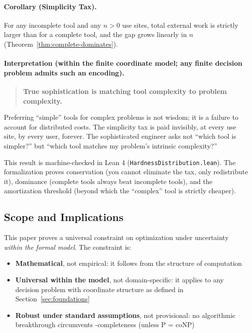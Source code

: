 \paragraph{Corollary (Simplicity Tax).}
For any incomplete tool and any $n>0$ use sites, total external work is strictly larger than for a complete tool, and the gap grows linearly in $n$ (Theorem~\ref{thm:complete-dominates}).

\paragraph{Interpretation (within the finite coordinate model; any finite decision problem admits such an encoding).}
\begin{quote}
\textbf{True sophistication is matching tool complexity to problem complexity.}
\end{quote}

Preferring ``simple'' tools for complex problems is not wisdom; it is a failure to account for distributed costs. The simplicity tax is paid invisibly, at every use site, by every user, forever. The sophisticated engineer asks not ``which tool is simpler?'' but ``which tool matches my problem's intrinsic complexity?''

This result is machine-checked in Lean 4 (\texttt{HardnessDistribution.lean}). The formalization proves conservation (you cannot eliminate the tax, only redistribute it), dominance (complete tools always beat incomplete tools), and the amortization threshold (beyond which the ``complex'' tool is strictly cheaper).

\subsection*{Scope and Implications}

This paper proves a universal constraint on optimization under uncertainty \emph{within the formal model}. The constraint is:
\begin{itemize}
\item \textbf{Mathematical}, not empirical: it follows from the structure of computation
\item \textbf{Universal within the model}, not domain-specific: it applies to any decision problem with coordinate structure as defined in Section~\ref{sec:foundations}
\item \textbf{Robust under standard assumptions}, not provisional: no algorithmic breakthrough circumvents \coNP-completeness (unless P = coNP)
\end{itemize}

